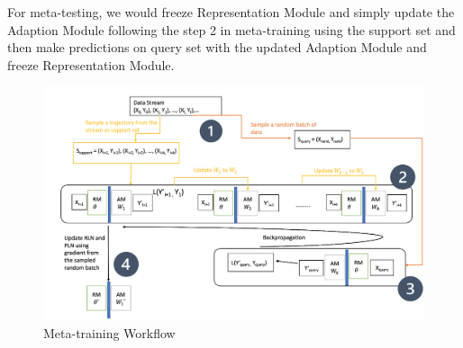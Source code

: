 For meta-testing, we would freeze Representation Module and simply update the Adaption Module following the step 2 in meta-training using the support set and then make predictions on query set with the updated Adaption Module and freeze Representation Module.
\begin{figure}[ht]
\centering
    \includegraphics[scale=0.6]{imgs/meta-training.png}
    \caption{Meta-training Workflow}
    \label{img:2}
\end{figure}
